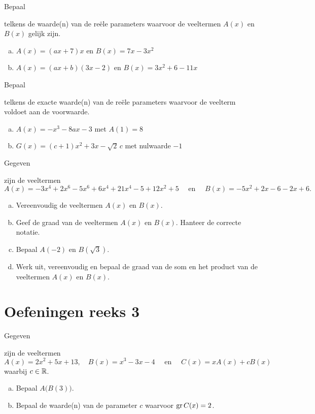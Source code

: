 \documentclass{ximera}
\begin{document}
\begin{exercise} 
\hypertarget{oef1.9}{Bepaal} telkens de waarde(n) van de re\"ele parameters waarvoor de veeltermen $A(x)$ en $B(x)$ gelijk zijn.
\begin{enumerate}[(a)]
\item
$A(x) = (ax+7)x$ en $B(x) = 7x-3x^2$ %
\item
$A(x) = (ax+b)(3x-2)$ en $B(x) = 3x^2+6-11x$ %
\end{enumerate}
\end{exercise} 

\begin{exercise} 
\hypertarget{oef1.10}{Bepaal} telkens de exacte waarde(n) van de re\"ele parameters waarvoor de veelterm voldoet aan de voorwaarde. 
\begin{enumerate}[(a)]
\item
$A(x) = -x^3-8ax-3$  %
met $A(1) = 8$ 
\item
$G(x) = (c+1)x^2+3x-\sqrt{2}\,c$ %
met nulwaarde $-1$
\end{enumerate}
\end{exercise} 

\begin{exercise} 
\hypertarget{oef1.11}{Gegeven} zijn de veeltermen 
\[
A(x) = -3x^4+2x^6-5x^6+6x^4+21x^4-5+12x^2+5 \quad \text{ en } \quad B(x) = -5x^2+2x-6-2x+6.
\]
\begin{enumerate}[(a)]
\item
Vereenvoudig de veeltermen $A(x)$ en $B(x)$.
\item
Geef de graad van de veeltermen $A(x)$ en $B(x)$. Hanteer de correcte notatie.
\item
Bepaal $A(-2)$ en $B(\sqrt{3})$. 
\item
Werk uit, vereenvoudig en bepaal de graad van de som en het product van de veeltermen $A(x)$ en $B(x)$. 
\end{enumerate}
\end{exercise} 



\section*{Oefeningen reeks 3}

\begin{exercise} 
\hypertarget{oef1.12}{Gegeven} zijn de veeltermen 
\[
A(x) = 2x^2 + 5x + 13, \quad B(x) =  x^3-3x-4  \quad \text{ en } \quad C(x) = xA(x) + cB(x)
\]
waarbij $c \in \mathbb{R}$.
\begin{enumerate}[(a)]
\item
Bepaal $A\bigl(B(3)\bigr)$.
\item
Bepaal de waarde(n) van de parameter $c$ waarvoor $\operatorname{gr} C(x) = 2$.
\end{enumerate}
\end{exercise} 
\end{document}
